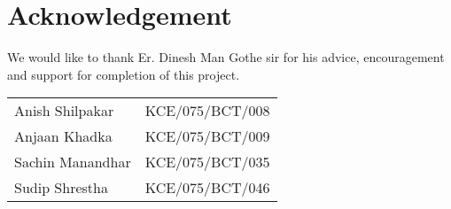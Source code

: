 \large
	\chapter*{Acknowledgement}
\normalsize
\justifying
We would like to thank Er. Dinesh Man Gothe sir for his advice, encouragement and support for completion of this project.\\


\begin{tabular}{p{1.5in}p{3in}}
	Anish Shilpakar & KCE/075/BCT/008\\
	Anjaan Khadka & KCE/075/BCT/009\\
	Sachin Manandhar & KCE/075/BCT/035\\
	Sudip Shrestha & KCE/075/BCT/046\\
\end{tabular}
\break